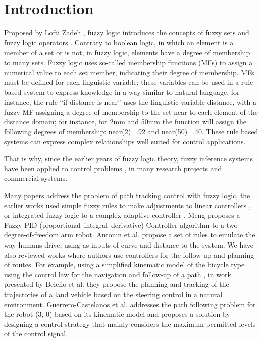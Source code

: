 \documentclass[symmetry,article,submit,moreauthors,pdftex]{Definitions/mdpi}
\begin{document}
\section{Introduction}

Proposed by Lofti Zadeh \cite{goguen_zadeh_1973}, fuzzy logic introduces the
concepts of fuzzy sets and fuzzy logic operators \cite{zadeh1996fuzzy}.
Contrary to boolean logic, in which an element is a member of a set or is not,
in fuzzy logic, elements have a degree of membership to many sets. Fuzzy logic uses
so-called membership functions (MFs) to assign a numerical value to each set
member, indicating their degree of membership. MFs must be defined for each
linguistic variable; these variables can be used in a rule-based system to
express knowledge in a way similar to natural language, for instance, the rule
``if distance is near'' uses the linguistic variable distance, with a fuzzy MF
assigning a degree of membership to the set near to each element of the
distance domain; for instance, for 2mm and 50mm the function will assign the
following degrees of membership: near(2)=.92 and near(50)=.40. These rule based
systems can express complex relationships well suited for control applications.

That is why, since the earlier years of fuzzy logic theory, fuzzy inference
systems \cite{driankov_introduction_2013} have been applied to control problems
\cite{mamdani1974application,king1977application,passino1998fuzzy,driankov_introduction_2013},
in many research projects \cite{yang_improved_2003,driankov_fuzzy_2013} and
commercial systems.

Many papers address the problem of path tracking control with fuzzy logic, the
earlier works used simple fuzzy rules to make adjustments to linear controllers
\cite{lee_practical_2003}, or integrated fuzzy logic to a complex adaptive
controller \cite{sanchez1997adaptive}. Meng \cite{bi_control_2020} proposes a
Fuzzy PID (proportional–integral–derivative) Controller %
algorithm to a two-degree-of-freedom arm robot. Antonin et al.
\cite{antonelli_fuzzy-logic-based_2007} propose a set of rules to emulate the
way humans drive, using as inputs of curve and distance to the system.  We have
also reviewed works where authors use controllers for the follow-up and
planning of routes. For example, using a simplified kinematic model of the
bicycle type using the control law for the navigation and follow-up of a path
\cite{laumond_robot_1998}, in work presented by Beleño et al.
\cite{beleno_planeacion_2014} they propose the planning and tracking of the
trajectories of a land vehicle based on the steering control in a natural
environment.  Guerrero-Castelanos et al.
\cite{guerrero-castellanos_trajectory_2014} addresses the path following
problem for the robot (3, 0) based on its kinematic model and proposes a
solution by designing a control strategy that mainly considers the maximum
permitted levels of the control signal. 
\end{document}
